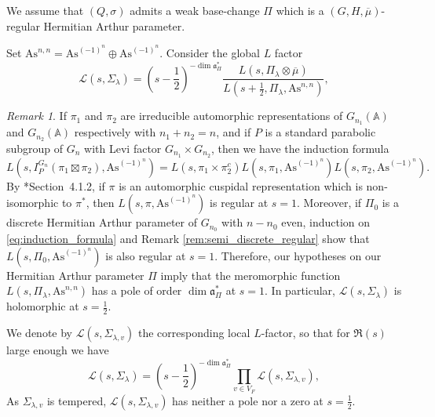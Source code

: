 \documentclass[letterpaper,11pt]{amsart}
\newcommand{\fa}{\mathfrak{a}}
\newcommand{\bA}{\mathbb{A}}
\newcommand{\cL}{\mathcal{L}}
\newcommand{\<}{\negthickspace}
\theoremstyle{definition}
\theoremstyle{plain}
\theoremstyle{remark}
\newtheorem{remark}[definition]{Remark}
\numberwithin{equation}{section}
\begin{document}
We assume that $(Q,\sigma)$ admits a weak base-change $\Pi$ which is a $(G,H,\overline{\mu})$-regular Hermitian Arthur parameter.

Set $\mathrm{As}^{n,n}=\mathrm{As}^{(-1)^{n}} \oplus \mathrm{As}^{(-1)^{n}}$. Consider the global $L$ factor 
\begin{equation*}
    \cL(s,\Sigma_\lambda)=(s-\frac{1}{2})^{-\dim \fa_\Pi^*}\frac{L(s,\Pi_\lambda \otimes \overline{\mu})}{L(s+\frac{1}{2},\Pi_\lambda,\mathrm{As}^{n,n})},
\end{equation*}

\begin{remark}
\label{rk:L_pole}
    If $\pi_1$ and $\pi_2$ are irreducible automorphic representations of $G_{n_1}(\bA)$ and $G_{n_2}(\bA)$ respectively with $n_1+n_2=n$, and if $P$ is a standard parabolic subgroup of $G_n$ with Levi factor $G_{n_1} \times G_{n_2}$, then we have the induction formula
    \begin{equation}
    \label{eq:induction_formula}
        L(s,I_P^{G_n}(\pi_1 \boxtimes \pi_2),\mathrm{As}^{(-1)^n})=L(s,\pi_1 \times \pi_2 ^{c})     L(s,\pi_1,\mathrm{As}^{(-1)^n})L(s,\pi_2,\mathrm{As}^{(-1)^n}).
    \end{equation}
    By \cite{BPCZ}*{Section~4.1.2}, if $\pi$ is an automorphic cuspidal representation which is non-isomorphic to $\pi^*$, then $L(s,\pi,\mathrm{As}^{(-1)^n})$ is regular at $s=1$. Moreover, if $\Pi_0$ is a discrete Hermitian Arthur parameter of $G_{n_0}$ with $n-n_0$ even, induction on \eqref{eq:induction_formula} and Remark \ref{rem:semi_discrete_regular} show that $L(s,\Pi_0,\mathrm{As}^{(-1)^n})$ is also regular at $s=1$. Therefore, our hypotheses on our Hermitian Arthur parameter $\Pi$ imply that the meromorphic function $L(s,\Pi_\lambda,\mathrm{As}^{n,n})$ has a pole of order $\dim \fa_\Pi^*$ at $s=1$. In particular, $\cL(s,\Sigma_\lambda)$ is holomorphic at $s=\frac{1}{2}$. 
\end{remark}

We denote by $\cL(s,\Sigma_{\lambda,v})$ the corresponding local $L$-factor, so that for $\Re(s)$ large enough we have
\begin{equation*}
    \cL(s,\Sigma_\lambda)=(s-\frac{1}{2})^{-\dim \fa_\Pi^*}\prod_{v \in V_F} \cL(s,\Sigma_{\lambda,v}),
\end{equation*}
As $\Sigma_{\lambda,v}$ is tempered, $\cL(s,\Sigma_{\lambda,v})$ has neither a pole nor a zero at $s=\frac{1}{2}$. 
\end{document}
